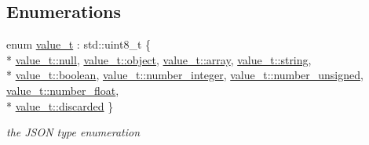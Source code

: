 \subsection*{Enumerations}
\begin{DoxyCompactItemize}
\item 
enum \hyperlink{namespacenlohmann_1_1detail_a1ed8fc6239da25abcaf681d30ace4985}{value\+\_\+t} \+: std\+::uint8\+\_\+t \{ \\*
\hyperlink{namespacenlohmann_1_1detail_a1ed8fc6239da25abcaf681d30ace4985a37a6259cc0c1dae299a7866489dff0bd}{value\+\_\+t\+::null}, 
\hyperlink{namespacenlohmann_1_1detail_a1ed8fc6239da25abcaf681d30ace4985aa8cfde6331bd59eb2ac96f8911c4b666}{value\+\_\+t\+::object}, 
\hyperlink{namespacenlohmann_1_1detail_a1ed8fc6239da25abcaf681d30ace4985af1f713c9e000f5d3f280adbd124df4f5}{value\+\_\+t\+::array}, 
\hyperlink{namespacenlohmann_1_1detail_a1ed8fc6239da25abcaf681d30ace4985ab45cffe084dd3d20d928bee85e7b0f21}{value\+\_\+t\+::string}, 
\\*
\hyperlink{namespacenlohmann_1_1detail_a1ed8fc6239da25abcaf681d30ace4985a84e2c64f38f78ba3ea5c905ab5a2da27}{value\+\_\+t\+::boolean}, 
\hyperlink{namespacenlohmann_1_1detail_a1ed8fc6239da25abcaf681d30ace4985a5763da164f8659d94a56e29df64b4bcc}{value\+\_\+t\+::number\+\_\+integer}, 
\hyperlink{namespacenlohmann_1_1detail_a1ed8fc6239da25abcaf681d30ace4985adce7cc8ec29055c4158828921f2f265e}{value\+\_\+t\+::number\+\_\+unsigned}, 
\hyperlink{namespacenlohmann_1_1detail_a1ed8fc6239da25abcaf681d30ace4985ad9966ecb59667235a57b4b999a649eef}{value\+\_\+t\+::number\+\_\+float}, 
\\*
\hyperlink{namespacenlohmann_1_1detail_a1ed8fc6239da25abcaf681d30ace4985a94708897ec9db8647dfe695714c98e46}{value\+\_\+t\+::discarded}
 \}\begin{DoxyCompactList}\small\item\em the J\+S\+ON type enumeration \end{DoxyCompactList}
\end{DoxyCompactItemize}

